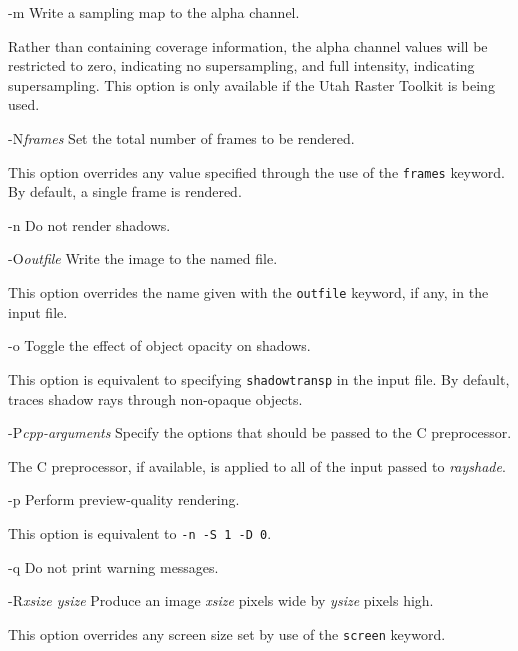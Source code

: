 \begin{defkey}{-m}{}
	Write a sampling map to the alpha channel.
\end{defkey}
Rather than containing coverage information, the alpha channel values
will be restricted to zero, indicating no supersampling, and full intensity,
indicating supersampling.  This option is only available if the Utah
Raster Toolkit is being used.

\begin{defkey}{-N}{{\em frames}}
	Set the total number of frames to be rendered.
\end{defkey}
This option overrides any value specified through the use of the
{\tt frames} keyword.  By default, a single frame is rendered.

\begin{defkey}{-n}{}
	Do not render shadows.
\end{defkey}

\begin{defkey}{-O}{{\em outfile}}
	Write the image to the named file.
\end{defkey}
This option overrides the name given with the {\tt outfile} keyword,
if any,
in the input file.

\begin{defkey}{-o}{}
	Toggle the effect of object opacity on shadows.
\end{defkey}
This option is equivalent to specifying {\tt shadowtransp}
in the input file.  By default, {\rayshade} traces shadow
rays through non-opaque objects.

\begin{defkey}{-P}{{\em cpp-arguments}}
	Specify the options that should be passed to the C
	preprocessor.
\end{defkey}
The C preprocessor, if available, is applied to all of the input
passed to {\em rayshade}.

\begin{defkey}{-p}{}
	Perform preview-quality rendering.
\end{defkey}
This option is equivalent to {\tt -n -S 1 -D 0}.

\begin{defkey}{-q}{}
	Do not print warning messages.
\end{defkey}

\begin{defkey}{-R}{{\em xsize ysize}}
	Produce an image {\em xsize} pixels wide by
	{\em ysize} pixels high.
\end{defkey}
This option overrides any screen size set by use of
the {\tt screen} keyword.

